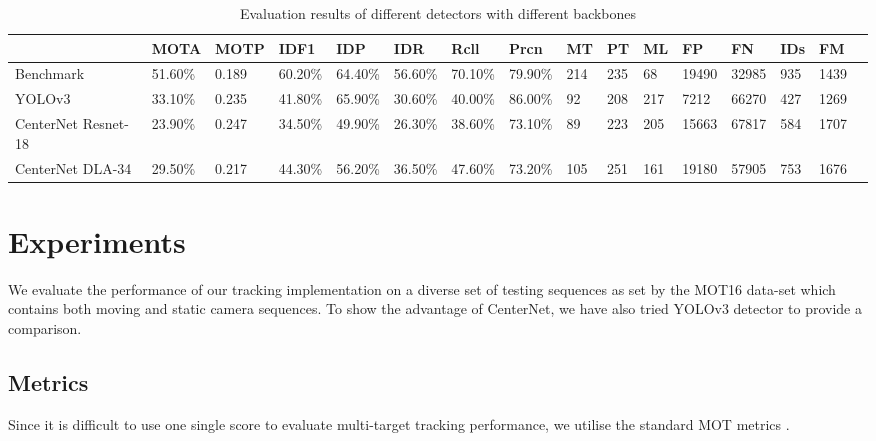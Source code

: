 \documentclass[conference]{IEEEtran}
\begin{document}
\begin{table*}[b]
\centering
\caption{Evaluation results of different detectors with different backbones}
\label{eva}
\begin{tabular}{llllllllllllllll}
\hline
                    & MOTA    & MOTP  & IDF1    & IDP     & IDR     & Rcll    & Prcn     & MT  & PT  & ML  & FP    & FN    & IDs & FM   \\ \hline
Benchmark           & 51.60\% & 0.189 & 60.20\% & 64.40\% & 56.60\% & 70.10\% & 79.90\% & 214 & 235 & 68  & 19490 & 32985 & 935 & 1439 \\
YOLOv3              & 33.10\% & 0.235 & 41.80\% & 65.90\% & 30.60\% & 40.00\% & 86.00\% & 92  & 208 & 217 & 7212  & 66270 & 427 & 1269 \\
CenterNet Resnet-18 & 23.90\% & 0.247 & 34.50\% & 49.90\% & 26.30\% & 38.60\% & 73.10\% & 89  & 223 & 205 & 15663 & 67817 & 584 & 1707 \\
CenterNet DLA-34    & 29.50\% & 0.217 & 44.30\% & 56.20\% & 36.50\% & 47.60\% & 73.20\% & 105 & 251 & 161 & 19180 & 57905 & 753 & 1676 \\
\hline
\end{tabular}
\end{table*}



\section{Experiments}
We evaluate the performance of our tracking implementation on a diverse set of testing sequences as set by the MOT16 data-set \cite{milan2016mot16} which contains both moving and static camera sequences. To show the advantage of CenterNet, we have also tried YOLOv3 detector to provide a comparison.

\subsection{Metrics}
Since it is difficult to use one single score to evaluate multi-target tracking performance, we utilise the standard MOT metrics \cite{bernardin2008evaluating}.
\end{document}
